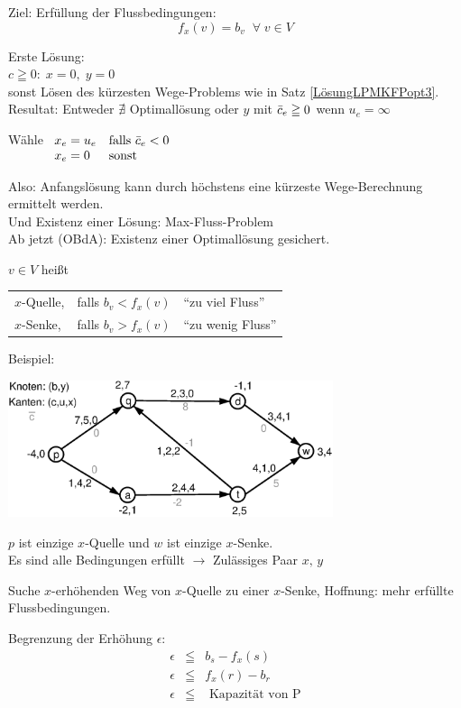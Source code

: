 Ziel: Erfüllung der Flussbedingungen:
\[f_{x}(v)=b_{v} \; \; \forall \; v \in V\]

Erste Lösung:\\
$c \geqq 0: \; x=0, \; y = 0$\\
sonst Lösen des kürzesten Wege-Problems wie in Satz
\ref{LösungLPMKFPopt3}.\\
Resultat: Entweder $\nexists$ Optimallösung oder $y$ mit $\bar{c}_{e} \geqq 0$
wenn $u_{e} = \infty$

Wähle $\begin{array}[t]{ll}x_{e} = u_{e} & \mbox{falls } \bar{c}_{e} < 0\\
x_{e} = 0& \mbox{sonst}\end{array}$ 

Also: Anfangslösung kann durch höchstens eine kürzeste Wege-Berechnung
ermittelt werden.\\
Und Existenz einer Lösung: Max-Fluss-Problem\\
Ab jetzt (OBdA): Existenz einer Optimallösung gesichert.

$v \in V$ heißt \begin{tabular}[t]{lll}$x$-Quelle,&falls $b_{v} <f_{x}(v)$& 
"`zu viel Fluss"'\\
$x$-Senke,&falls $b_{v} > f_{x}(v)$&"`zu wenig Fluss"'\end{tabular} 


Beispiel:

\includegraphics[height=4cm]{bilder/4-3PDMinKostFL}

$p$ ist einzige $x$-Quelle und $w$ ist einzige $x$-Senke.\\
Es sind alle Bedingungen erfüllt $\rightarrow$ Zulässiges Paar $x,\,y$

Suche $x$-erhöhenden Weg von $x$-Quelle zu einer $x$-Senke, Hoffnung: mehr
erfüllte Flussbedingungen.

Begrenzung der Erhöhung $\epsilon$:
\[\begin{array}{rcl}
\epsilon &\leqq& b_{s} - f_{x}(s)\\
\epsilon &\leqq& f_{x}(r)-b_{r}\\
\epsilon &\leqq& \mbox{ Kapazität von P}
\end{array}\]

